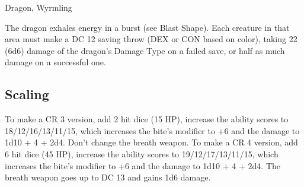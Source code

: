 \begin{DndMonster}[float*=b,width=\textwidth + 8pt]{Dragon, Wyrmling}
\begin{multicols}{2}
The dragon exhales energy in a burst (see Blast Shape). Each creature in that area must make a DC 12 saving throw (DEX or CON based on color), taking 22 (6d6) damage of the dragon's Damage Type on a failed save, or half as much damage on a successful one.
\subsection{Scaling}
To make a CR 3 version, add 2 hit dice (15 HP), increase the ability scores to 18/12/16/13/11/15, which increases the bite's modifier to +6 and the damage to 1d10 + 4 + 2d4. Don't change the breath weapon.
To make a CR 4 version, add 6 hit dice (45 HP), increase the ability scores to 19/12/17/13/11/15, which increases the bite's modifier to +6 and the damage to 1d10 + 4 + 2d4. The breath weapon goes up to DC 13 and gains 1d6 damage.
\end{multicols}
\end{DndMonster}
